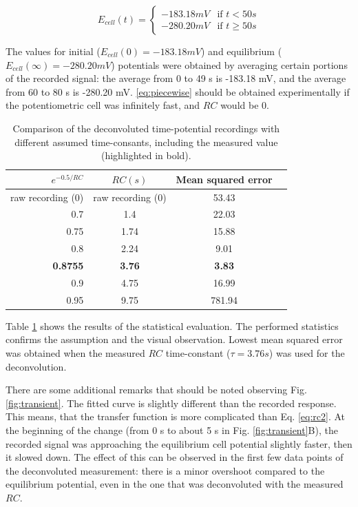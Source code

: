 \begin{equation}
E_{cell}(t) =
\left\{
	\begin{array}{ll}
		-183.18 mV & \mbox{if } t < 50 s \\
		-280.20 mV & \mbox{if } t \geq 50 s
	\end{array}
\right.
\label{eq:piecewise}
\end{equation}

The values for initial ($E_{cell}(0) = -183.18 mV$) and equilibrium ($E_{cell}(\infty) = -280.20 mV$) potentials were obtained by averaging certain portions of the recorded signal: the average from 0 to 49 s is -183.18 mV, and the average from 60 to 80 s is -280.20 mV.
\ref{eq:piecewise} should be obtained experimentally if the potentiometric cell was infinitely fast, and $RC$ would be 0.

\begin{table}
                \caption{Comparison of the deconvoluted time-potential recordings with different assumed time-consants, including the measured value (highlighted in bold).}
                \label{table:rc}
                \centering
                \begin{tabular}{r c c c}
                        $e^{-0.5/RC}$ & $RC (s)$ & Mean squared error \\
                        \hline
                        raw recording (0) & raw recording (0) & 53.43 \\
                        0.7 & 1.4 & 22.03  \\
                        0.75 & 1.74 & 15.88  \\
                        0.8 & 2.24 & 9.01 \\
			\textbf{0.8755} & \textbf{3.76} & \textbf{3.83} \\
			0.9 & 4.75 & 16.99 \\
			0.95 & 9.75 & 781.94 \\
                \end{tabular}
\end{table}

Table \ref{table:rc} shows the results of the statistical evaluation.
The performed statistics confirms the assumption and the visual observation.
Lowest mean squared error was obtained when the measured $RC$ time-constant ($\tau = 3.76 s$) was used for the deconvolution.

There are some additional remarks that should be noted observing Fig. \ref{fig:transient}.
The fitted curve is slightly different than the recorded response.
This means, that the transfer function is more complicated than Eq. \ref{eq:rc2}.
At the beginning of the change (from 0 s to about 5 s in Fig. \ref{fig:transient}B), the recorded signal was approaching the equilibrium cell potential slightly faster, then it slowed down.
The effect of this can be observed in the first few data points of the deconvoluted measurement: there is a minor overshoot compared to the equilibrium potential, even in the one that was deconvoluted with the measured $RC$.

